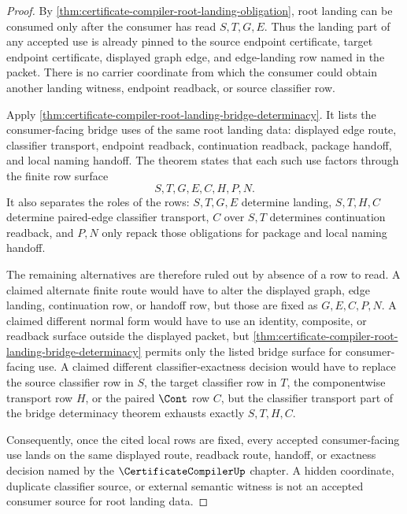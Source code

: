 \begin{proof}
By \autoref{thm:certificate-compiler-root-landing-obligation}, root landing can be consumed only after the consumer has read $S,T,G,E$. Thus the landing part of any accepted use is already pinned to the source endpoint certificate, target endpoint certificate, displayed graph edge, and edge-landing row named in the packet. There is no carrier coordinate from which the consumer could obtain another landing witness, endpoint readback, or source classifier row.

Apply \autoref{thm:certificate-compiler-root-landing-bridge-determinacy}. It lists the consumer-facing bridge uses of the same root landing data: displayed edge route, classifier transport, endpoint readback, continuation readback, package handoff, and local naming handoff. The theorem states that each such use factors through the finite row surface
$$
S,T,G,E,C,H,P,N.
$$
It also separates the roles of the rows: $S,T,G,E$ determine landing, $S,T,H,C$ determine paired-edge classifier transport, $C$ over $S,T$ determines continuation readback, and $P,N$ only repack those obligations for package and local naming handoff.

The remaining alternatives are therefore ruled out by absence of a row to read. A claimed alternate finite route would have to alter the displayed graph, edge landing, continuation row, or handoff row, but those are fixed as $G,E,C,P,N$. A claimed different normal form would have to use an identity, composite, or readback surface outside the displayed packet, but \autoref{thm:certificate-compiler-root-landing-bridge-determinacy} permits only the listed bridge surface for consumer-facing use. A claimed different classifier-exactness decision would have to replace the source classifier row in $S$, the target classifier row in $T$, the componentwise transport row $H$, or the paired $\Cont$ row $C$, but the classifier transport part of the bridge determinacy theorem exhausts exactly $S,T,H,C$.

Consequently, once the cited local rows are fixed, every accepted consumer-facing use lands on the same displayed route, readback route, handoff, or exactness decision named by the $\CertificateCompilerUp$ chapter. A hidden coordinate, duplicate classifier source, or external semantic witness is not an accepted consumer source for root landing data.
\end{proof}
